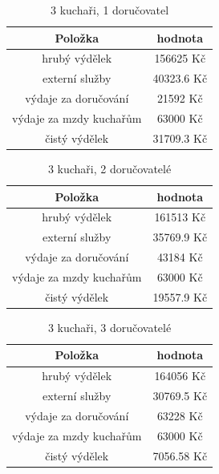 \documentclass[a4paper, 11pt]{article}
\begin{document}
\begin{table}[h]
\centering
\begin{tabular}{cc}
\textbf{Položka} & \textbf{hodnota}                                                                                   \\ \hline
hrubý výdělek & 156625 Kč \\ \hline
externí služby  & 40323.6 Kč \\ \hline                      
výdaje za doručování &  21592 Kč \\ \hline
výdaje za mzdy kuchařům &  63000 Kč \\ \hline
čistý výdělek & 31709.3 Kč
\end{tabular}
\caption{3 kuchaři, 1 doručovatel}
\end{table}

\begin{table}[h]
\centering
\begin{tabular}{cc}
\textbf{Položka} & \textbf{hodnota}                                                                                   \\ \hline
hrubý výdělek & 161513 Kč \\ \hline
externí služby  & 35769.9 Kč \\ \hline                      
výdaje za doručování &  43184 Kč \\ \hline
výdaje za mzdy kuchařům &  63000 Kč \\ \hline
čistý výdělek &  19557.9 Kč \\ \hline
\end{tabular}
\caption{3 kuchaři, 2 doručovatelé}
\end{table}

\begin{table}[h]
\centering
\begin{tabular}{cc}
\textbf{Položka} & \textbf{hodnota}                                                                                   \\ \hline
hrubý výdělek & 164056 Kč \\ \hline
externí služby  & 30769.5 Kč \\ \hline                      
výdaje za doručování &  63228 Kč \\ \hline
výdaje za mzdy kuchařům &  63000 Kč \\ \hline
čistý výdělek &  7056.58 Kč \\ \hline
\end{tabular}
\caption{3 kuchaři, 3 doručovatelé}
\end{table}
\end{document}
